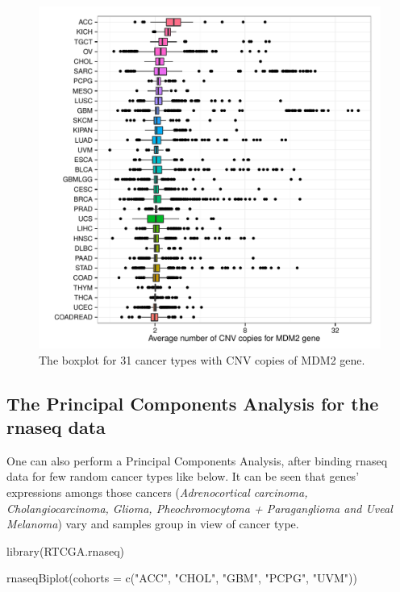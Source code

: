 \begin{figure}[h!]
\includegraphics[width=12cm]{cnv.pdf}
\caption{\label{biplot2}The boxplot for 31 cancer types with CNV copies of MDM2 gene.}
\end{figure}

\newpage

\subsection{The Principal Components Analysis for the rnaseq
data}\label{the-principal-components-analysis-for-the-rnaseq-data}

One can also perform a Principal Components Analysis, after binding
rnaseq data for few random cancer types like below. It can be seen that
genes' expressions amongs those cancers (\emph{Adrenocortical carcinoma,
Cholangiocarcinoma, Glioma, Pheochromocytoma + Paraganglioma and Uveal
Melanoma}) vary and samples group in view of cancer type.

\begin{Schunk}
\begin{Sinput}
library(RTCGA.rnaseq)

rnaseqBiplot(cohorts = c("ACC", "CHOL", "GBM", "PCPG", "UVM"))
\end{Sinput}
\end{Schunk}

